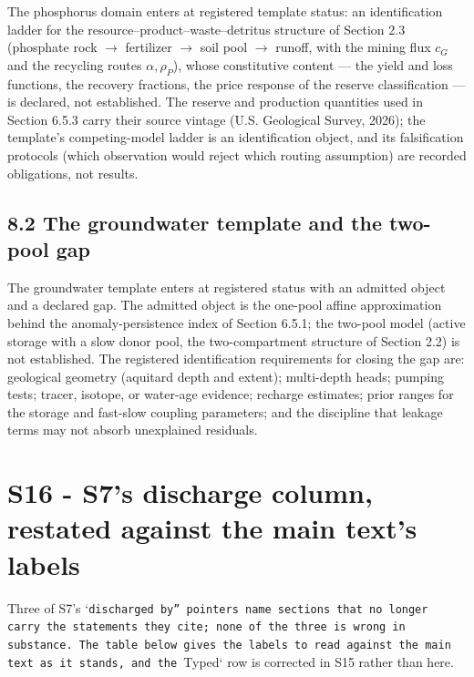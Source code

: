 \documentclass[11pt]{article}
\begin{document}
The phosphorus domain enters at registered template status: an identification ladder for the resource--product--waste--detritus structure of Section 2.3 (phosphate rock \(\rightarrow\) fertilizer \(\rightarrow\) soil pool \(\rightarrow\) runoff, with the mining flux \(c_G\) and the recycling routes \(\alpha, \rho_P\)), whose constitutive content --- the yield and loss functions, the recovery fractions, the price response of the reserve classification --- is declared, not established. The reserve and production quantities used in Section 6.5.3 carry their source vintage (U.S. Geological Survey, 2026); the template's competing-model ladder is an identification object, and its falsification protocols (which observation would reject which routing assumption) are recorded obligations, not results.

\subsection*{8.2 The groundwater template and the two-pool gap}\label{82-the-groundwater-template-and-the-two-pool-gap}

The groundwater template enters at registered status with an admitted object and a declared gap. The admitted object is the one-pool affine approximation behind the anomaly-persistence index of Section 6.5.1; the two-pool model (active storage with a slow donor pool, the two-compartment structure of Section 2.2) is not established. The registered identification requirements for closing the gap are: geological geometry (aquitard depth and extent); multi-depth heads; pumping tests; tracer, isotope, or water-age evidence; recharge estimates; prior ranges for the storage and fast-slow coupling parameters; and the discipline that leakage terms may not absorb unexplained residuals.

\section*{S16 - S7's discharge column, restated against the main text's labels}\label{s16---s7's-discharge-column-restated-against-the-main-text's-labels}

Three of S7's `\texttt{discharged b\allowbreak{}y'' pointers\allowbreak{} name sectio\allowbreak{}ns that no l\allowbreak{}onger carry \allowbreak{}the statemen\allowbreak{}ts they cite\allowbreak{}; none of th\allowbreak{}e three is w\allowbreak{}rong in subs\allowbreak{}tance. The t\allowbreak{}able below g\allowbreak{}ives the lab\allowbreak{}els to read \allowbreak{}against the \allowbreak{}main text as\allowbreak{} it stands, \allowbreak{}and the }Typed` row is corrected in S15 rather than here.
\end{document}
